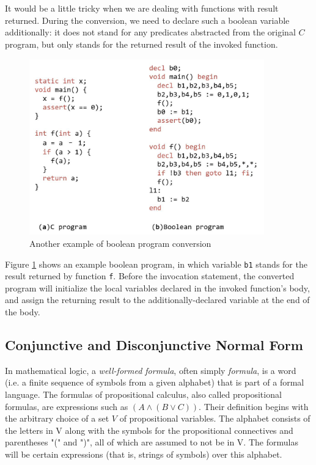 It would be a little tricky when we are dealing with functions with result returned. During the conversion, we need to declare such a boolean variable additionally: it does not stand for any predicates abstracted from the original $C$ program, but only stands for the returned result of the invoked function.

\begin{figure}
\centering
\includegraphics[width=4in,height=3in]{Fig2-3.jpg}
\caption{Another example of boolean program conversion}
\label{fig:BPC_1}
\end{figure}

Figure \ref{fig:BPC_1} shows an example boolean program, in which variable \lstinline|b1| stands for the result returned by function \lstinline|f|.
Before the invocation statement, the converted program will initialize the local variables declared in the invoked function's body, and assign the returning result to the additionally-declared variable at the end of the body.

\subsection{Conjunctive and Disconjunctive Normal Form}
\label{section:CNF_DNF}
In mathematical logic, a \textit{well-formed formula}, often simply \textit{formula}, is a word (i.e. a finite sequence of symbols from a given alphabet) that is part of a formal language.
The formulas of propositional calculus, also called propositional formulas\cite{FOLaATP}, are expressions such as $(A \wedge (B \vee C))$. Their definition begins with the arbitrary choice of a set $V$ of propositional variables. The alphabet consists of the letters in V along with the symbols for the propositional connectives and parentheses "(" and ")", all of which are assumed to not be in V. The formulas will be certain expressions (that is, strings of symbols) over this alphabet.

